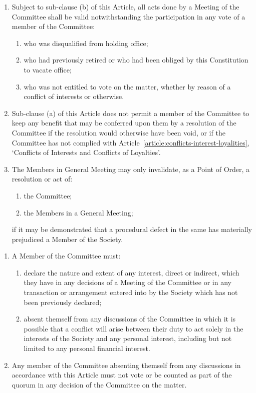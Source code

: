 \documentclass[12pt]{constitution}
\begin{document}
\begin{enumerate}
    \item Subject to sub-clause (b) of this Article, all acts done by a Meeting of the Committee shall be valid notwithstanding the participation in any vote of a member of the Committee:
    \begin{enumerate}
        \item who was disqualified from holding office;
        \item who had previously retired or who had been obliged by this Constitution to vacate office;
        \item who was not entitled to vote on the matter, whether by reason of a conflict of interests or otherwise.
    \end{enumerate}

    \item Sub-clause (a) of this Article does not permit a member of the Committee to keep any benefit that may be conferred upon them by a resolution of the Committee if the resolution would otherwise have been void, or if the Committee has not complied with Article~\ref{article:conflicts-interest-loyalities}, `Conflicts of Interests and Conflicts of Loyalties'.
    \item The Members in General Meeting may only invalidate, as a Point of Order, a resolution or act of:
    \begin{enumerate}
        \item the Committee;
        \item the Members in a General Meeting;
    \end{enumerate}
    if it may be demonstrated that a procedural defect in the same has materially prejudiced a Member of the Society.
\end{enumerate}


\label{article:conflicts-interest-loyalities}

\begin{enumerate}
    \item A Member of the Committee must:
    \begin{enumerate}
        \item declare the nature and extent of any interest, direct or indirect, which they have in any decisions of a Meeting of the Committee or in any transaction or arrangement entered into by the Society which has not been previously declared;
        \item absent themself from any discussions of the Committee in which it is possible that a conflict will arise between their duty to act solely in the interests of the Society and any personal interest, including but not limited to any personal financial interest.
    \end{enumerate}

    \item Any member of the Committee absenting themself from any discussions in accordance with this Article must not vote or be counted as part of the quorum in any decision of the Committee on the matter.
\end{enumerate}
\end{document}
